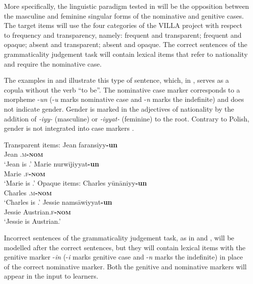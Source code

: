 \documentclass[output=paper,colorlinks,citecolor=brown,modfonts,nonflat]{../langscibook}
\begin{document}
More specifically, the linguistic paradigm tested in  will be the opposition between the masculine and feminine singular forms of the nominative and genitive cases. The target items will use the four categories of the VILLA project with respect to frequency and transparency, namely: frequent and transparent; frequent and opaque; absent and transparent; absent and opaque. The correct sentences of the grammaticality judgement task will contain lexical items that refer to nationality and require the nominative case. 

\newpage
The examples in  and  illustrate this type of sentence, which, in , serves as a copula without the verb “to be”. The nominative case marker corresponds to a morpheme -\textit{un} (-\textit{u} marks nominative case and -\textit{n} marks the indefinite) and does not indicate gender. Gender is marked in the adjectives of nationality by the addition of \textit{-iyy-} (masculine) or \textit{-iyyat-} (feminine) to the root. Contrary to Polish, gender is not integrated into  case markers \citep{Kouloughli2007}.

\ea%
    \label{ex:watorek:5}
    \ea%
    \label{ex:watorek:5a}
    Transparent items:
        \ea%
        \label{ex:watorek:5ai}
        \gll    Jean faransiyy\textbf{{-un}}\\
                Jean \textsc{.m\textbf{-nom}}\\
        \glt    ‘Jean is .’
        \ex%
        \label{ex:watorek:5aii}
        \gll    Marie nurwījiyyat\textbf{{-un}}\\
                Marie \textsc{.f\textbf{-nom}}\\
        \glt    ‘Marie is .’
        \z
    \ex%
    \label{ex:watorek:5b}
    Opaque items:
        \ea%
        \label{ex:watorek:5bi}
        \gll    Charles yūnāniyy\textbf{{-un}}\\
                Charles \textsc{.m\textbf{-nom}}\\
        \glt    ‘Charles is .’
        \ex%
        \label{ex:watorek:5bii}
        \gll    Jessie namsāwiyyat\textbf{{-un}}\\
                Jessie Austrian\textsc{.f\textbf{-nom}}\\
        \glt    ‘Jessie is Austrian.’
        \z
    \z
\z

Incorrect sentences of the grammaticality judgement task, as in  and , will be modelled after the correct sentences, but they will contain lexical items with the genitive marker -\textit{in} (-\textit{i} marks genitive case and -\textit{n} marks the indefinite) in place of the correct nominative marker. Both the genitive and nominative markers will appear in the input to learners.
\end{document}
